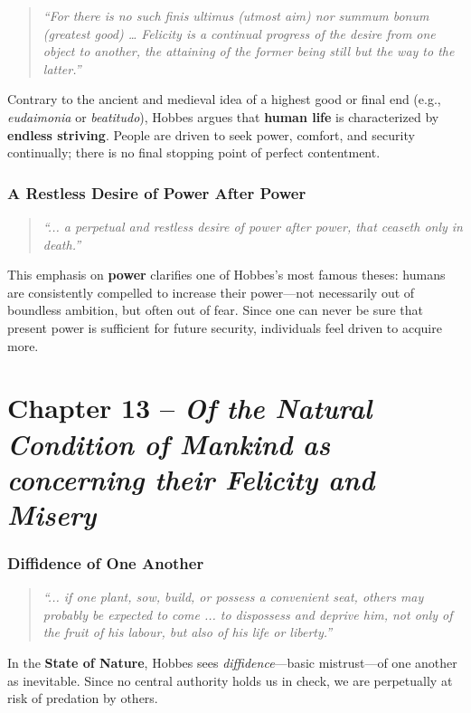 \begin{quote}
\textit{“For there is no such finis ultimus (utmost aim) nor summum bonum (greatest good) … Felicity is a continual progress of the desire from one object to another, the attaining of the former being still but the way to the latter.”}
\end{quote}

Contrary to the ancient and medieval idea of a highest good or final end (e.g., \textit{eudaimonia} or \textit{beatitudo}), Hobbes argues that \textbf{human life} is characterized by \textbf{endless striving}. People are driven to seek power, comfort, and security continually; there is no final stopping point of perfect contentment.

\subsubsection*{A Restless Desire of Power After Power}

\begin{quote}
\textit{“... a perpetual and restless desire of power after power, that ceaseth only in death.”}
\end{quote}

This emphasis on \textbf{power} clarifies one of Hobbes’s most famous theses: humans are consistently compelled to increase their power---not necessarily out of boundless ambition, but often out of fear. Since one can never be sure that present power is sufficient for future security, individuals feel driven to acquire more.

\section*{Chapter 13 -- \textit{Of the Natural Condition of Mankind as concerning their Felicity and Misery}}

\subsubsection*{Diffidence of One Another}

\begin{quote}
\textit{“... if one plant, sow, build, or possess a convenient seat, others may probably be expected to come ... to dispossess and deprive him, not only of the fruit of his labour, but also of his life or liberty.”}
\end{quote}

In the \textbf{State of Nature}, Hobbes sees \textit{diffidence}---basic mistrust---of one another as inevitable. Since no central authority holds us in check, we are perpetually at risk of predation by others.

